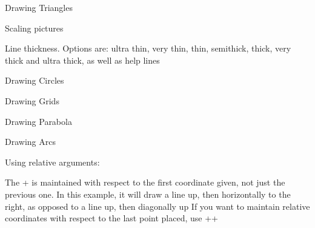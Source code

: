 \documentclass{article}
\begin{document}
Drawing Triangles


Scaling pictures


Line thickness. Options are: ultra thin, very thin, thin, semithick, thick,
very thick and ultra thick, as well as help lines


Drawing Circles


Drawing Grids


Drawing Parabola


Drawing Arcs


Using relative arguments:

The + is maintained with respect to the first coordinate given, not just the
previous one. In this example, it will draw a line up, then horizontally to
the right, as opposed to a line up, then diagonally up
If you want to maintain relative coordinates with respect to the last point
placed, use ++
\end{document}
